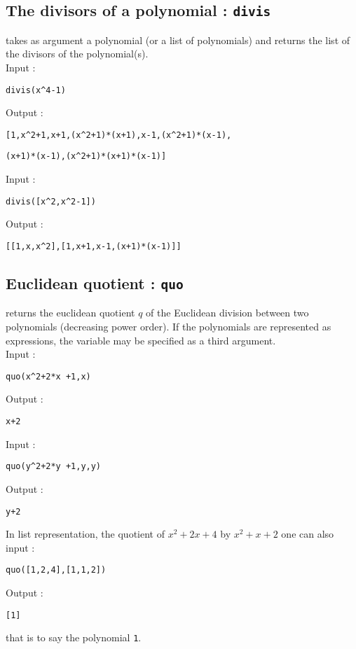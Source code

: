 \documentclass[a4paper,11pt]{book}
\begin{document}
\subsection{The divisors of a polynomial : {\tt divis}}
 takes as argument a polynomial (or a list of 
polynomials) and returns the list
 of the divisors of the polynomial(s).\\ 
Input : 
\begin{center}{\tt divis(x\verb|^|4-1)}\end{center}
Output :
\begin{center}{\tt [1,x\verb|^|2+1,x+1,(x\verb|^|2+1)*(x+1),x-1,(x\verb|^|2+1)*(x-1),}\end{center}
\begin{center}{\tt (x+1)*(x-1),(x\verb|^|2+1)*(x+1)*(x-1)]}\end{center}
Input : 
\begin{center}{\tt divis([x\verb|^|2,x\verb|^|2-1])}\end{center}
Output :
\begin{center}{\tt [[1,x,x\verb|^|2],[1,x+1,x-1,(x+1)*(x-1)]]}\end{center}

\subsection{Euclidean quotient : {\tt quo}}
 returns the euclidean quotient  $q$ of the
Euclidean division between two polynomials (decreasing power order).
If the polynomials are represented as 
expressions, the variable may be specified as a third
argument.\\
Input :
\begin{center}{\tt quo(x\verb|^|2+2*x +1,x)}\end{center}
Output :
\begin{center}{\tt x+2}\end{center}
Input :
\begin{center}{\tt quo(y\verb|^|2+2*y +1,y,y)}\end{center}
Output :
\begin{center}{\tt y+2}\end{center}
In list representation, the quotient of $x^2+2x+4$ by $x^2+x+2$ 
one can also input :
\begin{center}{\tt quo([1,2,4],[1,1,2])}\end{center}
Output :
\begin{center}{\tt [1]}\end{center}
that is to say  the polynomial {\tt 1}.
\end{document}
